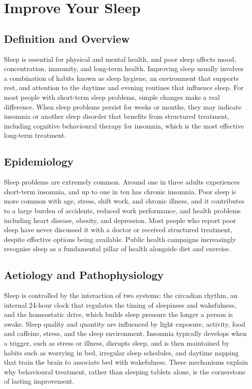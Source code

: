 \chapter{Improve Your Sleep}

\section*{Definition and Overview}
Sleep is essential for physical and mental health, and poor sleep affects mood, concentration, immunity, and long-term health. Improving sleep usually involves a combination of habits known as sleep hygiene, an environment that supports rest, and attention to the daytime and evening routines that influence sleep. For most people with short-term sleep problems, simple changes make a real difference. When sleep problems persist for weeks or months, they may indicate insomnia or another sleep disorder that benefits from structured treatment, including cognitive behavioural therapy for insomnia, which is the most effective long-term treatment.

\section*{Epidemiology}
Sleep problems are extremely common. Around one in three adults experiences short-term insomnia, and up to one in ten has chronic insomnia. Poor sleep is more common with age, stress, shift work, and chronic illness, and it contributes to a large burden of accidents, reduced work performance, and health problems including heart disease, obesity, and depression. Most people who report poor sleep have never discussed it with a doctor or received structured treatment, despite effective options being available. Public health campaigns increasingly recognise sleep as a fundamental pillar of health alongside diet and exercise.

\section*{Aetiology and Pathophysiology}
Sleep is controlled by the interaction of two systems: the circadian rhythm, an internal 24-hour clock that regulates the timing of sleepiness and wakefulness, and the homeostatic drive, which builds sleep pressure the longer a person is awake. Sleep quality and quantity are influenced by light exposure, activity, food and caffeine, stress, and the sleep environment. Insomnia typically develops when a trigger, such as stress or illness, disrupts sleep, and is then maintained by habits such as worrying in bed, irregular sleep schedules, and daytime napping that train the brain to associate bed with wakefulness. These mechanisms explain why behavioural treatment, rather than sleeping tablets alone, is the cornerstone of lasting improvement.

